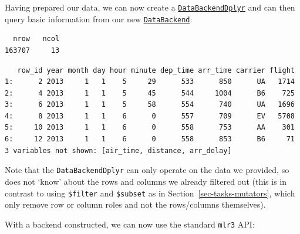 Having prepared our data, we can now create a
\href{https://mlr3db.mlr-org.com/reference/DataBackendDplyr.html}{\texttt{DataBackendDplyr}}
and can then query basic information from our new
\href{https://mlr3.mlr-org.com/reference/DataBackend.html}{\texttt{DataBackend}}:

\begin{Shaded}
\begin{Highlighting}[]
\OtherTok{=}  \NormalTok{)}
\NormalTok{(}\SpecialCharTok{$}\SpecialCharTok{$}
\end{Highlighting}
\end{Shaded}

\begin{verbatim}
  nrow   ncol 
163707     13 
\end{verbatim}

\begin{Shaded}
\begin{Highlighting}[]
\SpecialCharTok{$}\NormalTok{()}
\end{Highlighting}
\end{Shaded}

\begin{verbatim}
   row_id year month day hour minute dep_time arr_time carrier flight
1:      2 2013     1   1    5     29      533      850      UA   1714
2:      4 2013     1   1    5     45      544     1004      B6    725
3:      6 2013     1   1    5     58      554      740      UA   1696
4:      8 2013     1   1    6      0      557      709      EV   5708
5:     10 2013     1   1    6      0      558      753      AA    301
6:     12 2013     1   1    6      0      558      853      B6     71
3 variables not shown: [air_time, distance, arr_delay]
\end{verbatim}

Note that the \texttt{DataBackendDplyr} can only operate on the data we
provided, so does not `know' about the rows and columns we already
filtered out (this is in contrast to using \texttt{\$filter} and
\texttt{\$subset} as in Section~\ref{sec-tasks-mutators}, which only
remove row or column roles and not the rows/columns themselves).

With a backend constructed, we can now use the standard \texttt{mlr3}
API:

